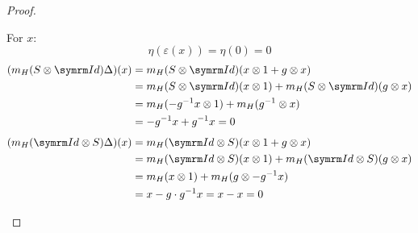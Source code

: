 \begin{proof}
\begin{itemize}
    For \(x\):
    \[
        \eta(\varepsilon(x)) = \eta (0) = 0
    \]
    \begin{align*}
        (m_H (S \tensor \Id) \Delta) (x) &= m_H (S \tensor \Id) (x \tensor 1 + g \tensor x) \\
        &= m_H (S \tensor \Id) (x \tensor 1) + m_H (S \tensor \Id) (g \tensor x) \\
        &= m_H (- g^{-1} x \tensor 1) + m_H (g^{-1} \tensor x) \\
        &= -g^{-1} x + g^{-1} x = 0
    \end{align*}
    \begin{align*}
        (m_H (\Id \tensor S) \Delta) (x) &= m_H (\Id \tensor S) (x \tensor 1 + g \tensor x) \\
        &= m_H (\Id \tensor S) (x \tensor 1) + m_H (\Id \tensor S) (g \tensor x) \\
        &= m_H (x \tensor 1) + m_H (g \tensor -g^{-1} x) \\
        &= x - g \cdot g^{-1} x = x - x = 0
    \end{align*}
\end{itemize}
\end{proof}

